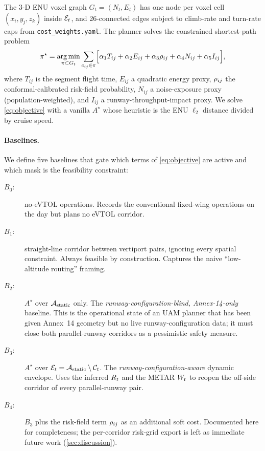 The 3-D ENU voxel graph $G_t = (N_t, E_t)$ has one node per voxel cell
$(x_i, y_j, z_k)$ inside $\mathcal{E}_t$, and 26-connected edges subject to
climb-rate and turn-rate caps from \texttt{cost\_weights.yaml}. The planner
solves the constrained shortest-path problem
\begin{equation}
\pi^\star
=
\operatorname*{arg\,min}_{\pi \subset G_t}
\sum_{e_{ij}\in\pi}
\Bigl[
\alpha_1 T_{ij} + \alpha_2 E_{ij} + \alpha_3 \rho_{ij} + \alpha_4 N_{ij} + \alpha_5 I_{ij}
\Bigr],
\label{eq:objective}
\end{equation}
where $T_{ij}$ is the segment flight time, $E_{ij}$ a quadratic energy proxy,
$\rho_{ij}$ the conformal-calibrated risk-field probability,
$N_{ij}$ a noise-exposure proxy (population-weighted), and $I_{ij}$ a
runway-throughput-impact proxy. We solve \cref{eq:objective} with a vanilla
$A^\star$ whose heuristic is the ENU $\ell_2$ distance divided by cruise
speed.

\paragraph{Baselines.}
We define five baselines that gate which terms of \cref{eq:objective} are
active and which mask is the feasibility constraint:
\begin{description}
\item[$B_0$:] no-eVTOL operations. Records the conventional fixed-wing
    operations on the day but plans no eVTOL corridor.
\item[$B_1$:] straight-line corridor between vertiport pairs, ignoring
    every spatial constraint. Always feasible by construction. Captures the
    naive ``low-altitude routing'' framing.
\item[$B_2$:] $A^\star$ over $\mathcal{A}_{\mathrm{static}}$ only. The
    \emph{runway-configuration-blind, Annex-14-only} baseline. This is the
    operational state of an UAM planner that has been given Annex~14 geometry
    but no live runway-configuration data; it must close both parallel-runway
    corridors as a pessimistic safety measure.
\item[$B_3$:] $A^\star$ over $\mathcal{E}_t = \mathcal{A}_{\mathrm{static}} \setminus \mathcal{C}_t$. The
    \emph{runway-configuration-aware} dynamic envelope. Uses the inferred
    $R_t$ and the METAR $W_t$ to reopen the off-side corridor of every
    parallel-runway pair.
\item[$B_4$:] $B_3$ plus the risk-field term $\rho_{ij}$ as an additional
    soft cost. Documented here for completeness; the per-corridor risk-grid
    export is left as immediate future work
    (\cref{sec:discussion}).
\end{description}

